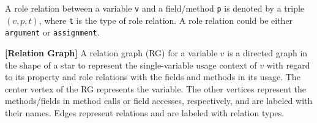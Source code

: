 A role relation between a variable \texttt{v} and a field/method
\texttt{p} is denoted by a triple $(v, p, t)$, where
\texttt{t} is the type of role relation. A role relation could
be either \texttt{argument} or \texttt{assignment}.







\begin{definition}{\bf [Relation Graph]}
A relation graph (RG) for a variable $v$ is a directed graph
in the shape of a star to represent the single-variable usage context
of $v$ with regard to its property and role relations with 
the fields and methods in its usage.
%
The center vertex of the RG represents the variable. The other vertices
represent the methods/fields in method calls or field accesses, respectively, and are labeled with their names. 
Edges represent relations and are labeled with relation types. 
\end{definition}

